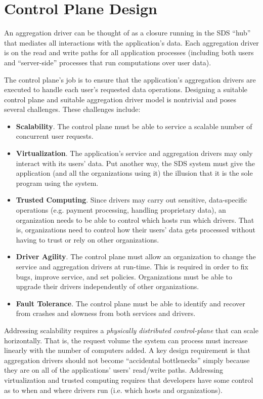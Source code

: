 \section{Control Plane Design}

An aggregation driver can be thought of as a closure running in the SDS ``hub''
that mediates all interactions with the application's data.  Each aggregation
driver is on the read and write paths for all application processes (including
both users and ``server-side'' processes that run computations over user data).

The control plane's job is to ensure that the application's aggregation
drivers are executed to handle each user's requested data operations.
Designing a suitable control plane and suitable aggregation driver
model is nontrivial and poses several challenges.  These challenges include:

\begin{itemize}
    \item \textbf{Scalability}.  The control plane must be able to service a
    scalable number of concurrent user requests. 
    \item \textbf{Virtualization}.  The application's service and aggregation
    drivers may only interact with its users' data.  Put another way,
      the SDS system must give the application (and all the organizations using
      it) the illusion that it is the sole program using the system.
    \item \textbf{Trusted Computing}.  Since drivers may carry out sensitive,
    data-specific operations (e.g. payment processing, handling proprietary
    data), an organization needs to be able to control which hosts run which
    drivers.  That is, organizations need to
    control how their users' data gets processed without having to trust or rely
    on other organizations.
    \item \textbf{Driver Agility}.  The control plane must allow an organization to
    change the service and aggregation drivers at run-time.
    This is required in order to fix bugs, improve service, and set policies.
    Organizations must be able to upgrade their drivers independently of other organizations.
    \item \textbf{Fault Tolerance}.  The control plane must be able to identify
    and recover from crashes and slowness from both services and drivers.
\end{itemize}

Addressing scalability requires a \emph{physically distributed control-plane} that can
scale horizontally.  That is, the request volume the system can process must
increase linearly with the number of computers added.
A key design requirement is that aggregation drivers should not become ``accidental
bottlenecks'' simply because they are on all of the applications' users' read/write paths.
Addressing virtualization and trusted computing requires that developers have some
control as to when and where drivers run (i.e. which hosts and organizations).

